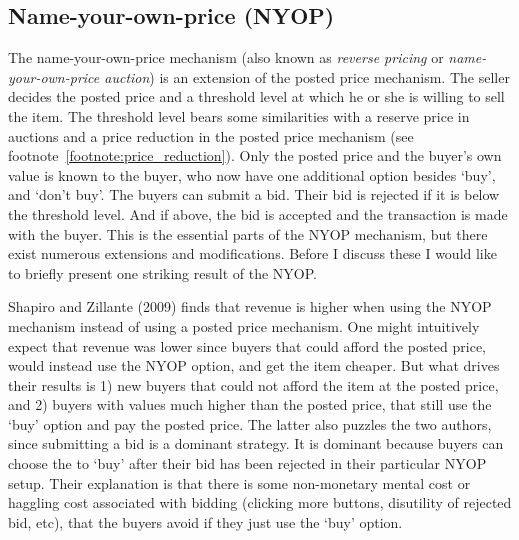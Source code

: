 \documentclass[a4paper,12pt]{article}
\begin{document}
	\subsection{Name-your-own-price (NYOP)}

	The name-your-own-price mechanism (also known as {\it reverse pricing} or {\it name-your-own-price auction}) is an extension of the posted price mechanism. The seller decides the posted price and a threshold level at which he or she is willing to sell the item. The threshold level bears some similarities with a reserve price in auctions and a price reduction in the posted price mechanism (see footnote~\ref{footnote:price_reduction}). Only the posted price and the buyer's own value is known to the buyer, who now have one additional option besides `buy', and `don't buy'. The buyers can submit a bid. Their bid is rejected if it is below the threshold level. And if above, the bid is accepted and the transaction is made with the buyer. This is the essential parts of the NYOP mechanism, but there exist numerous extensions and modifications. Before I discuss these I would like to briefly present one striking result of the NYOP.

	Shapiro and Zillante (2009) finds that revenue is higher when using the NYOP mechanism instead of using a posted price mechanism. One might intuitively expect that revenue was lower since buyers that could afford the posted price, would instead use the NYOP option, and get the item cheaper. But what drives their results is 1) new buyers that could not afford the item at the posted price, and 2) buyers with values much higher than the posted price, that still use the `buy' option and pay the posted price. The latter also puzzles the two authors, since submitting a bid is a dominant strategy. It is dominant because buyers can choose the to `buy' after their bid has been rejected in their particular NYOP setup. Their explanation is that there is some non-monetary mental cost or haggling cost associated with bidding (clicking more buttons, disutility of rejected bid, etc), that the buyers avoid if they just use the `buy' option.
\end{document}
